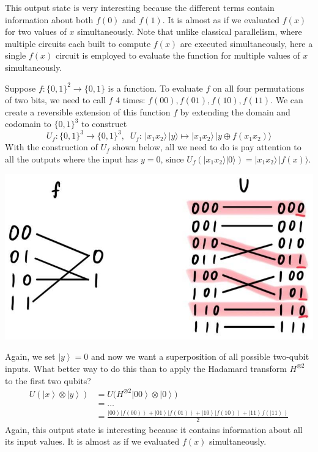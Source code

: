 \documentclass{article}
\newcommand{\ket}[1]{\ensuremath{\left|#1\right\rangle}}
\begin{document}
\begin{example}
      This output state is very interesting because the different terms contain information about both $f(0)$ and $f(1)$. It is almost as if we evaluated $f(x)$ for two values of $x$ simultaneously. Note that unlike classical parallelism, where multiple circuits each built to compute $f(x)$ are executed simultaneously, here a single $f(x)$ circuit is employed to evaluate the function for multiple values of $x$ simultaneously.
    \end{example}

    \begin{example}
      Suppose $f: \{0, 1\}^2 \longrightarrow \{0, 1\}$ is a function. To evaluate $f$ on all four permutations of two bits, we need to call $f$ 4 times: $f(00), f(01), f(10), f(11)$. We can create a reversible extension of this function $f$ by extending the domain and codomain to $\{0, 1\}^3$ to construct
      \begin{equation} 
        U_f: \{0, 1\}^3 \longrightarrow \{0, 1\}^3, \;\; U_f: \, |x_1 x_2 \rangle\,|y\rangle \mapsto |x_1 x_2 \rangle\, |y \oplus f(x_1 x_2) \rangle
      \end{equation}
      With the construction of $U_f$ shown below, all we need to do is pay attention to all the outputs where the input has $y=0$, since $U_f (|x_1 x_2 \rangle |0\rangle) = |x_1 x_2 \rangle \, |f(x) \rangle$.
      \begin{center}
        \includegraphics[scale=0.3]{img/f_to_U_reversible.jpg}
      \end{center}
      Again, we set $\ket{y} = 0$ and now we want a superposition of all possible two-qubit inputs. What better way to do this than to apply the Hadamard transform $H^{\otimes 2}$ to the first two qubits? 
      \begin{align} 
        U (\ket{x} \otimes \ket{y}) & = U \big( H^{\otimes 2} \ket{00} \otimes \ket{0} \big) \\
                                    & = \ldots \\
                                    & = \frac{\ket{00} \ket{f(00)} + \ket{01} \ket{f(01)} + \ket{10} \ket{f(10)} + \ket{11} f(\ket{11})}{2}
      \end{align}
      Again, this output state is interesting because it contains information about all its input values. It is almost as if we evaluated $f(x)$ simultaneously.
    \end{example}
    
\end{document}
